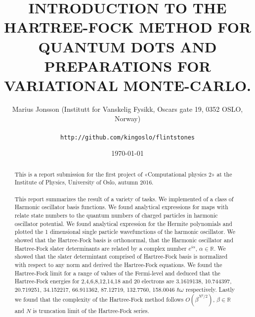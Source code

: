 \documentclass[11pt,english,a4paper]{article}
\author{\normalsize Marius Jonsson (Institutt for Vanskelig Fysikk, Oscars gate 19, 0352 OSLO, Norway) \\\\
\vspace{5px}
\normalsize \texttt{http://github.com/kingoslo/flintstones}}
\title{\bf \uppercase{Introduction to the Hartree-Fock method for quantum dots and preparations for variational monte-carlo.}}
\date{\normalsize \today}
\begin{document}
\maketitle
\begin{abstract} \normalsize This is a report submission for the first project of «Computational physics 2» at the Institute of Physics, University of Oslo, autumn 2016.\\
\\
This report summarizes the result of a variety of tasks. We implemented of a class of Harmonic oscillator basis functions. We found analytical expressions for maps with relate state numbers to the quantum numbers of charged particles in harmonic oscillator potential. We found analytical expression for the Hermite polynomials and plotted the 1 dimensional single particle wavefunctions of the harmonic oscillator. We showed that the Hartree-Fock basis is orthonormal, that the Harmonic oscillator and Hartree-Fock slater determinants are related by a complex number $e^{ i \alpha}$, $\alpha \in \mathbb{R}$. We showed that the slater determintant comprised of Hartree-Fock basis is normalized with respect to any norm and derived the Hartree-Fock equations. We found the Hartree-Fock limit for a range of values of the Fermi-level and deduced that the Hartree-Fock energies for 2,4,6,8,12,14,18 and 20 electrons are 3.1619138, 10.744397, 20.719251, 34.152217, 66.911362, 87.12719, 132.7760, 158.0046 $\hbar \omega$ respectively. Lastly we found that the complexity of the Hartree-Fock method follows $O(\beta^{N^2/2})$, $\beta \in \mathbb{R}$ and $N$ is truncation limit of the Hartree-Fock series.
\end{abstract}
\lstset{
  autogobble=true
  xleftmargin=.2\textwidth, xrightmargin=.2\textwidth
}
\end{document}
